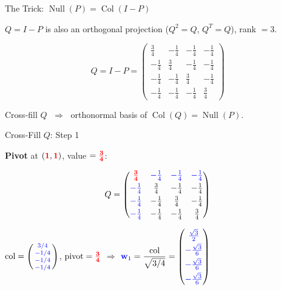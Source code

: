\documentclass[10pt]{beamer}
\theoremstyle{definition}
\newcommand{\x}[1]{\alert{\textbf{#1}}}
\newcommand{\pvt}[1]{{\color{red}\mathbf{#1}}}       %
\newcommand{\crs}[1]{{\color{blue}#1}}                %
\newcommand{\bl}[1]{{\color{blue}#1}}                 %
\begin{document}
\begin{frame}{The Trick: $\operatorname{Null}(P) = \operatorname{Col}(I - P)$}

$Q = I - P$ is also an orthogonal projection ($Q^2 = Q$, $Q^T = Q$), rank $= 3$.

$$Q = I - P = \begin{pmatrix} \frac{3}{4} & -\frac{1}{4} & -\frac{1}{4} & -\frac{1}{4} \\[3pt] -\frac{1}{4} & \frac{3}{4} & -\frac{1}{4} & -\frac{1}{4} \\[3pt] -\frac{1}{4} & -\frac{1}{4} & \frac{3}{4} & -\frac{1}{4} \\[3pt] -\frac{1}{4} & -\frac{1}{4} & -\frac{1}{4} & \frac{3}{4} \end{pmatrix}$$

\vspace{0.3em}

Cross-fill $Q$ $\;\Longrightarrow\;$ orthonormal basis of $\operatorname{Col}(Q) = \operatorname{Null}(P)$.

\end{frame}

\begin{frame}{Cross-Fill $Q$: Step 1}

\x{Pivot} at $(\pvt{1},\pvt{1})$, value $= \pvt{\frac{3}{4}}$:

$$Q = \begin{pmatrix} \pvt{\frac{3}{4}} & \crs{-\frac{1}{4}} & \crs{-\frac{1}{4}} & \crs{-\frac{1}{4}} \\[3pt] \crs{-\frac{1}{4}} & \frac{3}{4} & -\frac{1}{4} & -\frac{1}{4} \\[3pt] \crs{-\frac{1}{4}} & -\frac{1}{4} & \frac{3}{4} & -\frac{1}{4} \\[3pt] \crs{-\frac{1}{4}} & -\frac{1}{4} & -\frac{1}{4} & \frac{3}{4} \end{pmatrix}$$

$\text{col} = \left(\begin{smallmatrix} \crs{3/4} \\ \crs{-1/4} \\ \crs{-1/4} \\ \crs{-1/4} \end{smallmatrix}\right)$, \quad $\text{pivot} = \pvt{\frac{3}{4}}$ \qquad $\Longrightarrow$ \qquad $\bl{\mathbf{w}_1} = \dfrac{\text{col}}{\sqrt{3/4}} = \begin{pmatrix} \bl{\frac{\sqrt{3}}{2}} \\[3pt] \bl{-\frac{\sqrt{3}}{6}} \\[3pt] \bl{-\frac{\sqrt{3}}{6}} \\[3pt] \bl{-\frac{\sqrt{3}}{6}} \end{pmatrix}$

\end{frame}
\end{document}
